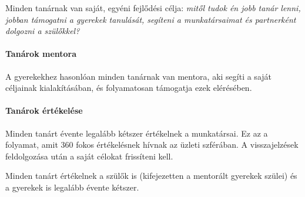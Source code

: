 Minden tanárnak van saját, egyéni fejlődési célja: \emph{mitől tudok én
jobb tanár lenni, jobban támogatni a gyerekek tanulását, segíteni a
munkatársaimat és partnerként dolgozni a szülőkkel?}

\hypertarget{tanarok-mentora}{%
\paragraph{Tanárok mentora}\label{tanarok-mentora}}

A gyerekekhez hasonlóan minden tanárnak van mentora, aki segíti a
saját céljainak kialakításában, és folyamatosan támogatja ezek elérésében.

\hypertarget{tanarok-ertekelese}{%
\paragraph{Tanárok értékelése}\label{tanarok-ertekelese}}

Minden tanárt évente legalább kétszer értékelnek a munkatársai. Ez az a
folyamat, amit 360 fokos értékelésnek hívnak az üzleti szférában. A
visszajelzések feldolgozása után a saját célokat frissíteni kell.

Minden tanárt értékelnek a szülők is (kifejezetten a mentorált gyerekek
szülei) és a gyerekek is legalább évente kétszer.
